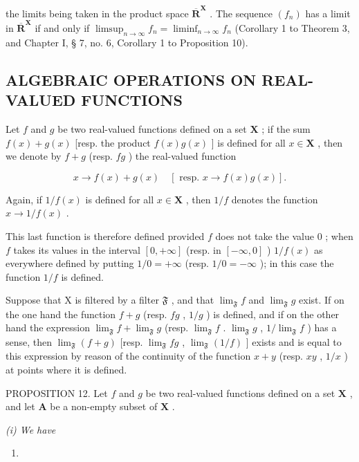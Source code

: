 the limits being taken in the product space \(\overline{\mathbf{R}}^{\mathbf{X}}\) . The sequence \((f_n)\) has a limit in \(\overline{\mathbf{R}}^{\mathbf{X}}\) if and only if \(\limsup_{n\to\infty}f_n=\liminf_{n\to\infty}f_n\) (Corollary 1 to Theorem 3, and Chapter I, § 7, no. 6, Corollary 1 to Proposition 10).

\subsection{ALGEBRAIC OPERATIONS ON REAL-VALUED FUNCTIONS}

Let \(f\) and \(g\) be two real-valued functions defined on a set \(\mathbf{X}\) ; if the sum \(f(x) + g(x)\) {[}resp. the product \(f(x)g(x)\) {]} is defined for all \(x \in \mathbf{X}\) , then we denote by \(f + g\) (resp. \(fg\) ) the real-valued function

\[
x \rightarrow f (x) + g (x) \quad [ \text { resp. } x \rightarrow f (x) g (x) ].
\]

Again, if \(1 / f(x)\) is defined for all \(x\in \mathbf{X}\) , then \(1 / f\) denotes the function \(x\to 1 / f(x)\) .

This last function is therefore defined provided \(f\) does not take the value \(0\) ; when \(f\) takes its values in the interval \([0, +\infty]\) (resp. in \([-\infty, 0]\) ) \(1/f(x)\) as everywhere defined by putting \(1/0 = +\infty\) (resp. \(1/0 = -\infty\) ); in this case the function \(1/f\) is defined.

Suppose that X is filtered by a filter \(\mathfrak{F}\) , and that \(\lim_{\mathfrak{F}} f\) and \(\lim_{\mathfrak{F}} g\) exist. If on the one hand the function \(f + g\) (resp. \(fg\) , \(1/g\) ) is defined, and if on the other hand the expression \(\lim_{\mathfrak{F}} f + \lim_{\mathfrak{F}} g\) (resp. \(\lim_{\mathfrak{F}} f\) . \(\lim_{\mathfrak{F}} g\) , \(1/\lim_{\mathfrak{F}} f\) ) has a sense, then \(\lim_{\mathfrak{F}} (f + g)\) {[}resp. \(\lim_{\mathfrak{F}} fg\) , \(\lim_{\mathfrak{F}} (1/f)\) {]} exists and is equal to this expression by reason of the continuity of the function \(x + y\) (resp. \(xy\) , \(1/x\) ) at points where it is defined.

PROPOSITION 12. Let \(f\) and \(g\) be two real-valued functions defined on a set \(\mathbf{X}\) , and let \(\mathbf{A}\) be a non-empty subset of \(\mathbf{X}\) .

\textit{(i) We have}

\begin{enumerate}
\def\labelenumi{(\arabic{enumi})}
\setcounter{enumi}{16}
\tightlist
\item
\end{enumerate}

